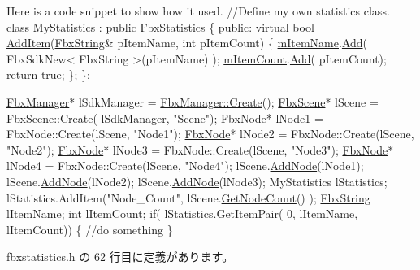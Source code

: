 \begin{DoxyCode}
 Here is a code snippet to show how it used.
\textcolor{comment}{//Define my own statistics class.}
class MyStatistics : \textcolor{keyword}{public} \hyperlink{class_fbx_statistics}{FbxStatistics}
\{
 \textcolor{keyword}{public}:
    \textcolor{keyword}{virtual} \textcolor{keywordtype}{bool} \hyperlink{class_fbx_statistics_abd81e5b31d33546ad6ba5fa9af34c792}{AddItem}(\hyperlink{class_fbx_string}{FbxString}& pItemName, \textcolor{keywordtype}{int} pItemCount)
    \{
        \hyperlink{class_fbx_statistics_a91d987cd85cf3e567b9c309c9389f02d}{mItemName}.\hyperlink{class_fbx_array_aad977e99a3924f6cd758f90c26435d21}{Add}( FbxSdkNew< FbxString >(pItemName) );
        \hyperlink{class_fbx_statistics_a9754af27b7b5d98fb085595e633370e8}{mItemCount}.\hyperlink{class_fbx_array_aad977e99a3924f6cd758f90c26435d21}{Add}( pItemCount);
        \textcolor{keywordflow}{return} \textcolor{keyword}{true};
    \};
\};

\hyperlink{class_fbx_manager}{FbxManager}* lSdkManager = \hyperlink{class_fbx_manager_af51cafc0f34f17d497f7921d847a4dd4}{FbxManager::Create}(); 
\hyperlink{class_fbx_scene}{FbxScene}*      lScene      = FbxScene::Create( lSdkManager, \textcolor{stringliteral}{"Scene"});
\hyperlink{class_fbx_node}{FbxNode}*       lNode1      = FbxNode::Create(lScene, \textcolor{stringliteral}{"Node1"});
\hyperlink{class_fbx_node}{FbxNode}*       lNode2      = FbxNode::Create(lScene, \textcolor{stringliteral}{"Node2"});
\hyperlink{class_fbx_node}{FbxNode}*       lNode3      = FbxNode::Create(lScene, \textcolor{stringliteral}{"Node3"});
\hyperlink{class_fbx_node}{FbxNode}*       lNode4      = FbxNode::Create(lScene, \textcolor{stringliteral}{"Node4"});
lScene.\hyperlink{class_fbx_scene_a4da84de06d868fd3542f4688834dff6d}{AddNode}(lNode1);
lScene.\hyperlink{class_fbx_scene_a4da84de06d868fd3542f4688834dff6d}{AddNode}(lNode2);
lScene.\hyperlink{class_fbx_scene_a4da84de06d868fd3542f4688834dff6d}{AddNode}(lNode3);
MyStatistics lStatistics;
lStatistics.AddItem(\textcolor{stringliteral}{"Node\_Count"}, lScene.\hyperlink{class_fbx_scene_a0cb1a1464b0fa1b8291c41900879515e}{GetNodeCount}() );
\hyperlink{class_fbx_string}{FbxString} lItemName;
\textcolor{keywordtype}{int}     lItemCount;
\textcolor{keywordflow}{if}( lStatistics.GetItemPair( 0, lItemName, lItemCount))
\{
    \textcolor{comment}{//do something}
\}
\end{DoxyCode}
 

 fbxstatistics.\+h の 62 行目に定義があります。



